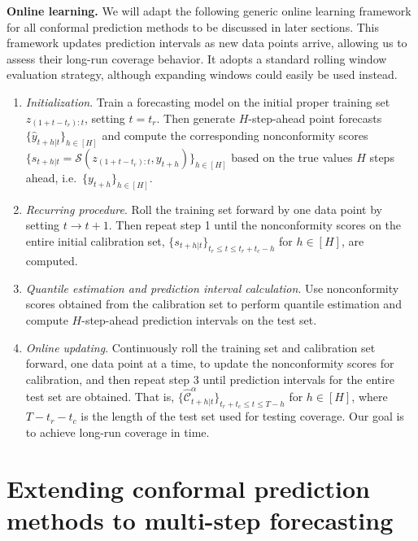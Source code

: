 \documentclass[
  11pt,
  a4paper,
]{article}
\theoremstyle{plain}
\theoremstyle{remark}
\begin{document}
\textbf{Online learning.} We will adapt the following generic online
learning framework for all conformal prediction methods to be discussed
in later sections. This framework updates prediction intervals as new
data points arrive, allowing us to assess their long-run coverage
behavior. It adopts a standard rolling window evaluation strategy,
although expanding windows could easily be used instead.

\begin{enumerate}
\def\labelenumi{\arabic{enumi}.}
\item
  \emph{Initialization}. Train a forecasting model on the initial proper
  training set \(z_{(1+t-t_r):t}\), setting \(t=t_r\). Then generate
  \(H\)-step-ahead point forecasts \(\{\hat{y}_{t+h|t}\}_{h\in[H]}\) and
  compute the corresponding nonconformity scores
  \(\{s_{t+h|t}=\mathcal{S}(z_{(1+t-t_r):t}, y_{t+h})\}_{h\in[H]}\)
  based on the true values \(H\) steps ahead,
  i.e.~\(\{y_{t+h}\}_{h\in[H]}\).
\item
  \emph{Recurring procedure}. Roll the training set forward by one data
  point by setting \(t \rightarrow t+1\). Then repeat step 1 until the
  nonconformity scores on the entire initial calibration set,
  \(\{s_{t+h|t}\}_{t_r \leq t \leq t_r+t_c-h}\) for \(h\in[H]\), are
  computed.
\item
  \emph{Quantile estimation and prediction interval calculation}. Use
  nonconformity scores obtained from the calibration set to perform
  quantile estimation and compute \(H\)-step-ahead prediction intervals
  on the test set.
\item
  \emph{Online updating}. Continuously roll the training set and
  calibration set forward, one data point at a time, to update the
  nonconformity scores for calibration, and then repeat step 3 until
  prediction intervals for the entire test set are obtained. That is,
  \(\{\hat{\mathcal{C}}_{t+h|t}^{\alpha}\}_{t_r+t_c \leq t \leq T-h}\)
  for \(h \in [H]\), where \(T-t_r-t_c\) is the length of the test set
  used for testing coverage. Our goal is to achieve long-run coverage in
  time.
\end{enumerate}


\section{Extending conformal prediction methods to multi-step
forecasting}\label{sec-ext}
\end{document}
